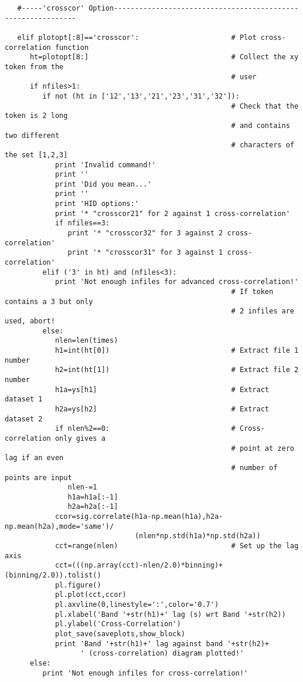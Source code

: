 \begin{verbatim}
   #-----'crosscor' Option-------------------------------------------------------------

   elif plotopt[:8]=='crosscor':                      # Plot cross-correlation function
      ht=plotopt[8:]                                  # Collect the xy token from the
                                                      # user
      if nfiles>1:
         if not (ht in ['12','13','21','23','31','32']):
                                                      # Check that the token is 2 long
                                                      # and contains two different
                                                      # characters of the set [1,2,3]
            print 'Invalid command!'
            print ''
            print 'Did you mean...'
            print ''
            print 'HID options:'
            print '* "crosscor21" for 2 against 1 cross-correlation'
            if nfiles==3:
               print '* "crosscor32" for 3 against 2 cross-correlation'
               print '* "crosscor31" for 3 against 1 cross-correlation'
         elif ('3' in ht) and (nfiles<3):
            print 'Not enough infiles for advanced cross-correlation!'
                                                      # If token contains a 3 but only
                                                      # 2 infiles are used, abort!
         else:
            nlen=len(times)
            h1=int(ht[0])                             # Extract file 1 number
            h2=int(ht[1])                             # Extract file 2 number
            h1a=ys[h1]                                # Extract dataset 1
            h2a=ys[h2]                                # Extract dataset 2
            if nlen%2==0:                             # Cross-correlation only gives a
                                                      # point at zero lag if an even
                                                      # number of points are input
               nlen-=1
               h1a=h1a[:-1]
               h2a=h2a[:-1]
            ccor=sig.correlate(h1a-np.mean(h1a),h2a-np.mean(h2a),mode='same')/
                               (nlen*np.std(h1a)*np.std(h2a))
            cct=range(nlen)                           # Set up the lag axis
            cct=(((np.array(cct)-nlen/2.0)*binning)+(binning/2.0)).tolist()
            pl.figure()
            pl.plot(cct,ccor)
            pl.axvline(0,linestyle=':',color='0.7')
            pl.xlabel('Band '+str(h1)+' lag (s) wrt Band '+str(h2))
            pl.ylabel('Cross-Correlation')
            plot_save(saveplots,show_block)
            print 'Band '+str(h1)+' lag against band '+str(h2)+
                  ' (cross-correlation) diagram plotted!'
      else:
         print 'Not enough infiles for cross-correlation!'


\end{verbatim}
